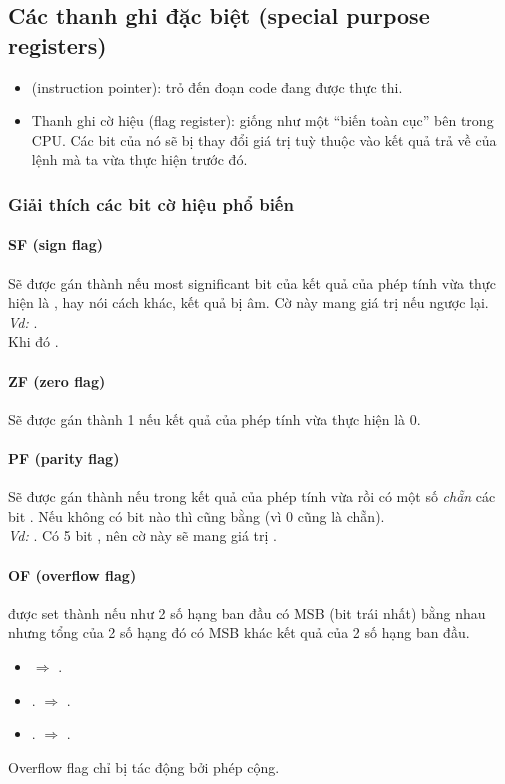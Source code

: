 \documentclass[main.tex]{subfiles}
\begin{document}
\subsection{Các thanh ghi đặc biệt (special purpose registers)}
\begin{itemize}
    \item {} (instruction pointer): trỏ đến đoạn code đang được thực thi.
    \item Thanh ghi cờ hiệu (flag register): giống như một ``biến toàn cục'' bên trong CPU. Các bit của nó sẽ bị thay đổi giá trị tuỳ thuộc vào kết quả trả về của lệnh mà ta vừa thực hiện trước đó.
\end{itemize}

\subsubsection{Giải thích các bit cờ hiệu phổ biến}
\paragraph{SF (sign flag)}
Sẽ được gán thành  nếu most significant bit của kết quả của phép tính vừa thực hiện là , hay nói cách khác, kết quả bị âm. Cờ này mang giá trị  nếu ngược lại.\break
\textit{Vd:}  \textcolor{red}{}.\\ 
Khi đó .
\bigskip

\paragraph{ZF (zero flag)}
Sẽ được gán thành 1 nếu kết quả của phép tính vừa thực hiện là 0.
\bigskip 

\paragraph{PF (parity flag)}
Sẽ được gán thành  nếu trong kết quả của phép tính vừa rồi có một số \textit{chẵn} các bit . Nếu không có bit  nào thì  cũng bằng  (vì 0 cũng là chẵn).\\
\textit{Vd:} . Có 5 bit , nên cờ này sẽ mang giá trị .

\paragraph{OF (overflow flag)}
 được set thành  nếu như 2 số hạng ban đầu có MSB (bit trái nhất) bằng nhau nhưng tổng của 2 số hạng đó có MSB khác kết quả của 2 số hạng ban đầu.
\begin{itemize}
    \item {}  $\Rightarrow$ .
    \item {}. $\Rightarrow$ .
    \item {}. $\Rightarrow$ .
\end{itemize}
Overflow flag chỉ bị tác động bởi phép cộng.
\end{document}
